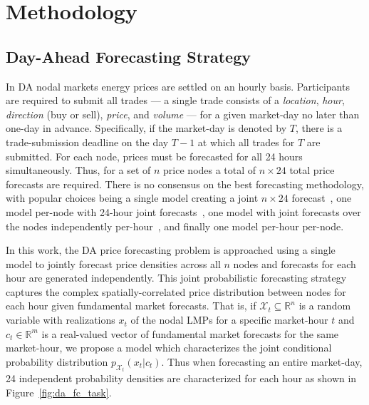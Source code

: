 \usepackage{amsmath}\chapter{Methodology}\label{ch:methodology}

\section{Day-Ahead Forecasting Strategy}\label{sec:proposed-methods}

In DA nodal markets energy prices are settled on an hourly basis.
Participants are required to submit all trades --- a single trade consists of a \textit{location}, \textit{hour},
\textit{direction} (buy or sell), \textit{price}, and \textit{volume} --- for a given market-day no later than one-day
in advance.
Specifically, if the market-day is denoted by $T$, there is a trade-submission deadline on the day $T-1$ at which all
trades for $T$ are submitted.
For each node, prices must be forecasted for all 24 hours simultaneously.
Thus, for a set of $n$ price nodes a total of $n \times 24$ total price forecasts are required.
There is no consensus on the best forecasting methodology, with popular choices being
a single model creating a joint $n \times 24$ forecast~\cite{9520248, 9916722},
one model per-node with 24-hour joint forecasts~\cite{00000, 7744689, LAGO2018386},
one model with joint forecasts over the nodes independently per-hour~\cite{5741753, 7478156, 8733097},
and finally one model per-hour per-node\cite{en9080621}.

In this work, the DA price forecasting problem is approached using a single model to jointly forecast price densities
across all $n$ nodes and forecasts for each hour are generated independently.
This joint probabilistic forecasting strategy captures the complex spatially-correlated price distribution between nodes
for each hour given fundamental market forecasts.
That is, if $\mathcal{X}_t \subseteq \mathbb{R}^n$ is a random variable with realizations $x_t$ of the nodal LMPs for a
specific market-hour $t$ and $c_t \in \mathbb{R}^m$ is a real-valued vector of fundamental market forecasts for the
same market-hour, we propose a model which characterizes the joint conditional probability distribution
 $p_{\mathcal{X}_t}(x_t | c_t)$.
Thus when forecasting an entire market-day, 24 independent probability densities are characterized for each hour as
shown in Figure~\ref{fig:da_fc_task}.

